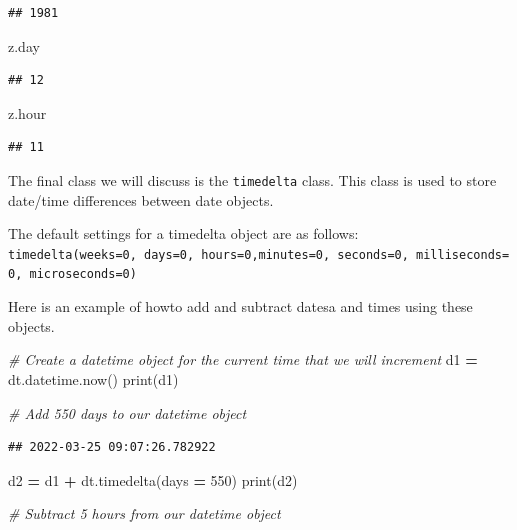 \documentclass[
]{book}
\newenvironment{Shaded}{\begin{snugshade}}{\end{snugshade}}
\newcommand{\BuiltInTok}[1]{#1}
\newcommand{\CommentTok}[1]{\textcolor[rgb]{0.56,0.35,0.01}{\textit{#1}}}
\newcommand{\DecValTok}[1]{\textcolor[rgb]{0.00,0.00,0.81}{#1}}
\newcommand{\NormalTok}[1]{#1}
\newcommand{\OperatorTok}[1]{\textcolor[rgb]{0.81,0.36,0.00}{\textbf{#1}}}
\begin{document}
\begin{verbatim}
## 1981
\end{verbatim}

\begin{Shaded}
\begin{Highlighting}[]
\NormalTok{z.day}
\end{Highlighting}
\end{Shaded}

\begin{verbatim}
## 12
\end{verbatim}

\begin{Shaded}
\begin{Highlighting}[]
\NormalTok{z.hour}
\end{Highlighting}
\end{Shaded}

\begin{verbatim}
## 11
\end{verbatim}

The final class we will discuss is the \texttt{timedelta} class. This class is used to store date/time differences between date objects.

The default settings for a timedelta object are as follows: \texttt{timedelta(weeks=0,\ days=0,\ hours=0,minutes=0,\ seconds=0,\ milliseconds=0,\ microseconds=0)}

Here is an example of howto add and subtract datesa and times using these objects.

\begin{Shaded}
\begin{Highlighting}[]
\CommentTok{\# Create a datetime object for the current time that we will increment}
\NormalTok{d1 }\OperatorTok{=}\NormalTok{ dt.datetime.now()}
\BuiltInTok{print}\NormalTok{(d1)}

\CommentTok{\# Add 550 days to our datetime object }
\end{Highlighting}
\end{Shaded}

\begin{verbatim}
## 2022-03-25 09:07:26.782922
\end{verbatim}

\begin{Shaded}
\begin{Highlighting}[]
\NormalTok{d2 }\OperatorTok{=}\NormalTok{ d1 }\OperatorTok{+}\NormalTok{ dt.timedelta(days }\OperatorTok{=} \DecValTok{550}\NormalTok{)}
\BuiltInTok{print}\NormalTok{(d2)}

\CommentTok{\# Subtract 5 hours from our datetime object }
\end{Highlighting}
\end{Shaded}
\end{document}
